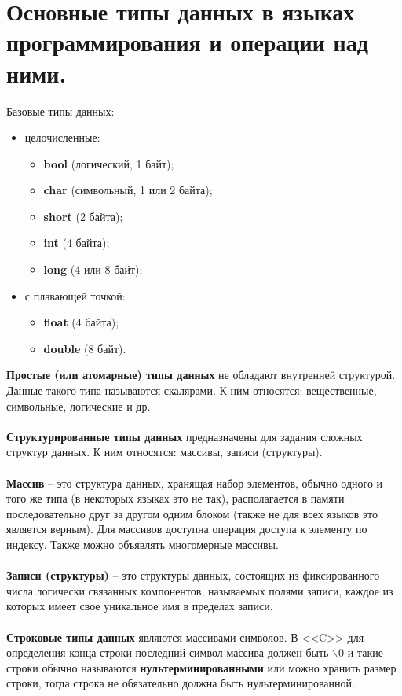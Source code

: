\documentclass[a4paper, 12pt]{report}
\numberwithin{equation}{section}
\begin{document}
	\section{Основные типы данных в языках программирования и операции над ними.}
	Базовые типы данных:
	\begin{itemize}
		\item целочисленные:
		\begin{itemize}
			\item \textbf{bool} (логический, 1 байт);
			\item \textbf{char} (символьный, 1 или 2 байта);
			\item \textbf{short} (2 байта);
			\item \textbf{int} (4 байта);
			\item \textbf{long} (4 или 8 байт);
		\end{itemize}
		\item с плавающей точкой:
		\begin{itemize}
			\item \textbf{float} (4 байта);
			\item \textbf{double} (8 байт).
		\end{itemize}
	\end{itemize}
	\textbf{Простые (или атомарные) типы данных} не обладают внутренней структурой. Данные такого типа называются скалярами. К ним относятся: вещественные, символьные, логические и др.
	\\\\
	\textbf{Структурированные типы данных} предназначены для задания сложных структур данных. К ним относятся: массивы, записи (структуры).
	\\\\
	\textbf{Массив} -- это структура данных, хранящая набор элементов, обычно одного и того же типа (в некоторых языках это не так), располагается в памяти последовательно друг за другом одним блоком (также не для всех языков это является верным). Для массивов доступна операция доступа к элементу по индексу. Также можно объявлять многомерные массивы.
	\\\\
	\textbf{Записи (структуры)} -- это структуры данных, состоящих из фиксированного числа логически связанных компонентов, называемых полями записи, каждое из которых имеет свое уникальное имя в пределах записи.
	\\\\
	\textbf{Строковые типы данных} являются массивами символов. В <<C>> для определения конца строки последний символ массива должен быть $\backslash0$ и такие строки обычно называются \textbf{нультерминированными} или можно хранить размер строки, тогда строка не обязательно должна быть нультерминированной.
\end{document}
